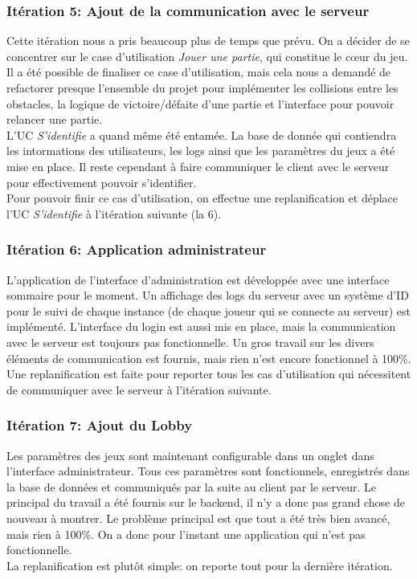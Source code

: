 \documentclass[a4paper,11pt]{article}
\begin{document}
	\subsubsection{Itération 5: Ajout de la communication avec le serveur}
	Cette itération nous a pris beaucoup plus de temps que prévu. On a décider de se concentrer sur le case d'utilisation \textit{Jouer une partie}, qui constitue le cœur du jeu. Il a été possible de finaliser ce case d'utilisation, mais cela nous a demandé de refactorer presque l'ensemble du projet pour implémenter les collisions entre les obstacles, la logique de victoire/défaite d'une partie et l'interface pour pouvoir relancer une partie. \\
	L'UC \textit{S'identifie} a quand même été entamée. La base de donnée qui contiendra les intormations des utilisateurs, les logs ainsi que les paramètres du jeux a été mise en place. Il reste cependant à faire communiquer le client avec le serveur pour effectivement pouvoir s'identifier. \\
	Pour pouvoir finir ce cas d'utilisation, on effectue une replanification et déplace l'UC \textit{S'identifie} à l'itération suivante (la 6).
	
	\subsubsection{Itération 6: Application administrateur}
	L'application de l'interface d'administration est développée avec une interface sommaire pour le moment. Un affichage des logs du serveur avec un système d'ID pour le suivi de chaque instance (de chaque joueur qui se connecte au serveur) est implémenté. L'interface du login est aussi mis en place, mais la communication avec le serveur est toujours pas fonctionnelle. Un gros travail sur les divers éléments de communication est fournis, mais rien n'est encore fonctionnel à 100\%. \\
	Une replanification est faite pour reporter tous les cas d'utilisation qui nécessitent de communiquer avec le serveur à l'itération suivante.
	
	\subsubsection{Itération 7: Ajout du Lobby}
	Les paramètres des jeux sont maintenant configurable dans un onglet dans l'interface administrateur. Tous ces paramètres sont fonctionnels, enregistrés dans la base de données et communiqués par la suite au client par le serveur. Le principal du travail a été fournis sur le backend, il n'y a donc pas grand chose de nouveau à montrer. Le problème principal est que tout a été très bien avancé, mais rien à 100\%. On a donc pour l'instant une application qui n'est pas fonctionnelle. \\
	La replanification est plutôt simple: on reporte tout pour la dernière itération.
	
\end{document}
